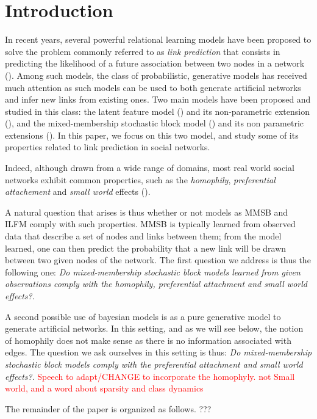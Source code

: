 \section{Introduction}
\label{sec:introduction}
In recent years, several powerful relational learning models have been proposed to solve the problem commonly referred to as \textit{link prediction} that consists in predicting the likelihood of a future association between two nodes in a network (\cite{Liben-Nowell07, HassanZaki11}). Among such models, the class of probabilistic, generative models has received much attention as such models can be used to both generate artificial networks and infer new links from existing ones. Two main models have been proposed and studied in this class: the latent feature model (\cite{BMF}) and its non-parametric extension (\cite{ILFRM}), and the mixed-membership stochastic block model (\cite{MMSB}) and its non parametric extensions (\cite{iMMSB,diMMSB}). In this paper, we focus on this two model, and study some of its properties related to link prediction in social networks. 

Indeed, although drawn from a wide range of domains, most real world social networks exhibit common properties, such as the \textit{homophily}, \textit{preferential attachement} and \textit{small world} effects (\cite{Newman2010, Barabasi2003}). 


A natural question that arises is thus whether or not models as MMSB and ILFM comply with such properties. MMSB is typically learned from observed data that describe a set of nodes and links between them; from the model learned, one can then predict the probability that a new link will be drawn between two given nodes of the network. The first question we address is thus the following one: \textit{Do  mixed-membership stochastic block models learned from given observations comply with the homophily, preferential attachment and small world effects?}.

A second possible use of bayesian models is as a pure generative model to generate artificial networks. In this setting, and as we will see below, the notion of homophily does not make sense as there is no information associated with edges. The question we ask ourselves in this setting is thus: \textit{Do mixed-membership stochastic block models comply with the preferential attachment and small world effects?}. \textcolor{red}{Speech to adapt/CHANGE to incorporate the homophyly. not Small world, and a word about sparsity and class dynamics}

The remainder of the paper is organized as follows. ???
